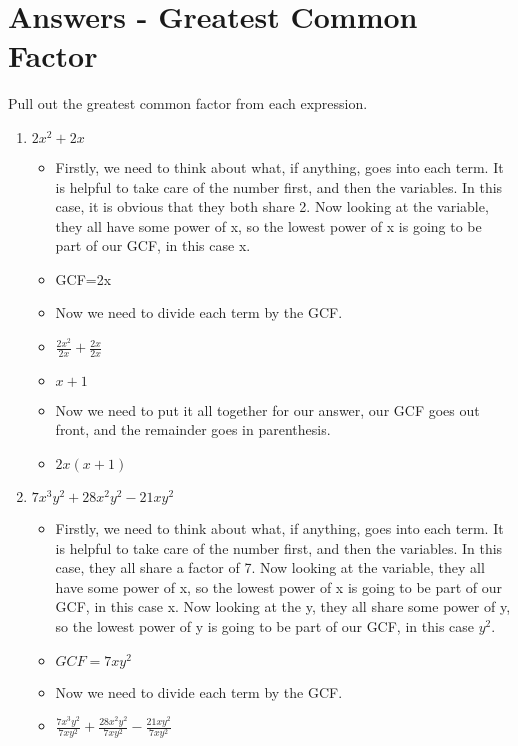 \section{Answers - Greatest Common Factor}
Pull out the greatest common factor from each expression. \\
\begin{enumerate}
\item $2x^{2} + 2x$
  \begin{itemize}
  \item Firstly, we need to think about what, if anything, goes into each term. It is helpful to take care of the number first, and then the variables. In this case, it is obvious that they both share 2. Now looking at the variable, they all have some power of x, so the lowest power of x is going to be part of our GCF, in this case x.
  \item [] GCF=2x
  \item Now we need to divide each term by the GCF.
  \item [] {\Large $\frac{2x^{2}}{2x} + \frac{2x}{2x}$}
  \item [] $x+1$
  \item Now we need to put it all together for our answer, our GCF goes out front, and the remainder goes in parenthesis.
  \item $2x(x+1)$
  \end{itemize}
\item $7x^{3}y^{2} + 28x^{2}y^{2} - 21xy^{2}$
  \begin{itemize}
  \item Firstly, we need to think about what, if anything, goes into each term. It is helpful to take care of the number first, and then the variables. In this case, they all share a factor of 7. Now looking at the variable, they all have some power of x, so the lowest power of x is going to be part of our GCF, in this case x. Now looking at the y, they all share some power of y, so the lowest power of y is going to be part of our GCF, in this case $y^{2}$.
  \item [] $GCF=7xy^{2}$
  \item Now we need to divide each term by the GCF.
  \item [] {\Large $\frac{7x^{3}y^{2}}{7xy^{2}} + \frac{28x^{2}y^{2}}{7xy^{2}} - \frac{21xy^{2}}{7xy^{2}}$}

\end{itemize}
\end{enumerate}
